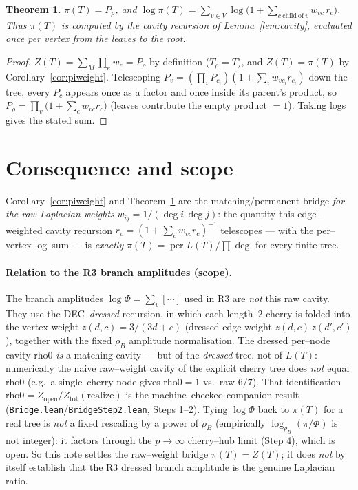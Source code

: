\documentclass[11pt]{article}
\newtheorem{theorem}{Theorem}
\newcommand{\per}{\operatorname{per}}
\begin{document}
\begin{theorem}\label{thm:H2}
$\pi(T)=P_\rho$, and $\log\pi(T)=\sum_{v\in V}\log\bigl(1+\sum_{c\ \mathrm{child\ of}\ v}w_{vc}\,r_c\bigr)$.
Thus $\pi(T)$ is computed by the cavity recursion of Lemma~\ref{lem:cavity}, evaluated once per vertex from
the leaves to the root.
\end{theorem}

\begin{proof}
$Z(T)=\sum_M\prod_ew_e=P_\rho$ by definition ($T_\rho=T$), and $Z(T)=\pi(T)$ by
Corollary~\ref{cor:piweight}. Telescoping $P_v=(\prod_iP_{c_i})(1+\sum_iw_{vc_i}r_{c_i})$ down the tree, every
$P_{c}$ appears once as a factor and once inside its parent's product, so
$P_\rho=\prod_{v}\bigl(1+\sum_{c}w_{vc}r_c\bigr)$ (leaves contribute the empty product $=1$). Taking logs gives
the stated sum.
\end{proof}

\section{Consequence and scope}

Corollary~\ref{cor:piweight} and Theorem~\ref{thm:H2} are the matching/permanent bridge \emph{for the raw
Laplacian weights} $w_{ij}=1/(\deg i\,\deg j)$: the quantity this edge--weighted cavity recursion
$r_v=(1+\sum_c w_{vc}r_c)^{-1}$ telescopes --- with the per--vertex log--sum --- is \emph{exactly}
$\pi(T)=\per L(T)/\prod\deg$ for every finite tree.

\paragraph{Relation to the R3 branch amplitudes (scope).}
The branch amplitudes $\log\Phi=\sum_v[\cdots]$ used in R3 are \emph{not} this raw cavity. They use the
DEC--\emph{dressed} recursion, in which each length--2 cherry is folded into the vertex weight
$z(d,c)=3/(3d+c)$ (dressed edge weight $z(d,c)\,z(d',c')$), together with the fixed $\rho_B$ amplitude
normalisation. The dressed per--node cavity $\mathrm{rho0}$ \emph{is} a matching cavity --- but of the
\emph{dressed} tree, not of $L(T)$: numerically the naive raw--weight cavity of the explicit cherry tree does
\emph{not} equal $\mathrm{rho0}$ (e.g.\ a single--cherry node gives $\mathrm{rho0}=1$ vs.\ raw $6/7$). That
identification $\mathrm{rho0}=Z_{\mathrm{open}}/Z_{\mathrm{tot}}(\mathrm{realize})$ is the machine--checked
companion result (\texttt{Bridge.lean}/\texttt{BridgeStep2.lean}, Steps 1--2). Tying $\log\Phi$ back to
$\pi(T)$ for a real tree is \emph{not} a fixed rescaling by a power of $\rho_B$ (empirically
$\log_{\rho_B}(\pi/\Phi)$ is not integer): it factors through the $p\to\infty$ cherry--hub limit (Step 4),
which is open. So this note settles the raw--weight bridge $\pi(T)=Z(T)$; it does \emph{not} by itself
establish that the R3 dressed branch amplitude is the genuine Laplacian ratio.
\end{document}
